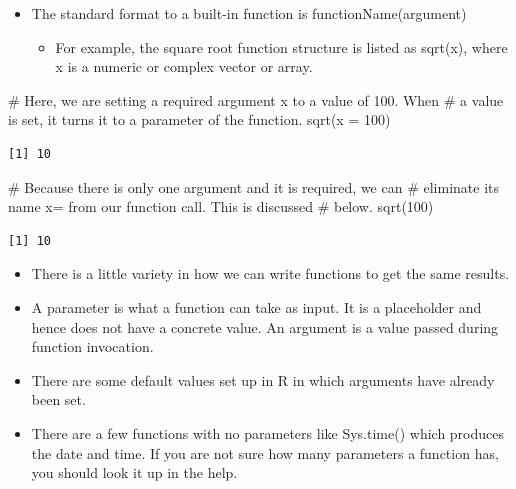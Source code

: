 \documentclass[
  letterpaper,
  DIV=11,
  numbers=noendperiod]{scrreprt}
\newenvironment{Shaded}{\begin{snugshade}}{\end{snugshade}}
\newcommand{\AttributeTok}[1]{\textcolor[rgb]{0.40,0.45,0.13}{#1}}
\newcommand{\CommentTok}[1]{\textcolor[rgb]{0.37,0.37,0.37}{#1}}
\newcommand{\DecValTok}[1]{\textcolor[rgb]{0.68,0.00,0.00}{#1}}
\newcommand{\FunctionTok}[1]{\textcolor[rgb]{0.28,0.35,0.67}{#1}}
\newcommand{\NormalTok}[1]{\textcolor[rgb]{0.00,0.23,0.31}{#1}}
\providecommand{\tightlist}{%
  \setlength{\itemsep}{0pt}\setlength{\parskip}{0pt}}\usepackage{longtable,booktabs,array}
\begin{document}
\begin{itemize}
\tightlist
\item
  The standard format to a built-in function is functionName(argument)

  \begin{itemize}
  \tightlist
  \item
    For example, the square root function structure is listed as
    sqrt(x), where x is a numeric or complex vector or array.
  \end{itemize}
\end{itemize}

\begin{Shaded}
\begin{Highlighting}[]
\CommentTok{\# Here, we are setting a required argument x to a value of 100. When}
\CommentTok{\# a value is set, it turns it to a parameter of the function.}
\FunctionTok{sqrt}\NormalTok{(}\AttributeTok{x =} \DecValTok{100}\NormalTok{)}
\end{Highlighting}
\end{Shaded}

\begin{verbatim}
[1] 10
\end{verbatim}

\begin{Shaded}
\begin{Highlighting}[]
\CommentTok{\# Because there is only one argument and it is required, we can}
\CommentTok{\# eliminate its name x= from our function call. This is discussed}
\CommentTok{\# below.}
\FunctionTok{sqrt}\NormalTok{(}\DecValTok{100}\NormalTok{)}
\end{Highlighting}
\end{Shaded}

\begin{verbatim}
[1] 10
\end{verbatim}

\begin{itemize}
\tightlist
\item
  There is a little variety in how we can write functions to get the
  same results.
\item
  A parameter is what a function can take as input. It is a placeholder
  and hence does not have a concrete value. An argument is a value
  passed during function invocation.
\item
  There are some default values set up in R in which arguments have
  already been set.
\item
  There are a few functions with no parameters like Sys.time() which
  produces the date and time. If you are not sure how many parameters a
  function has, you should look it up in the help.
\end{itemize}
\end{document}
